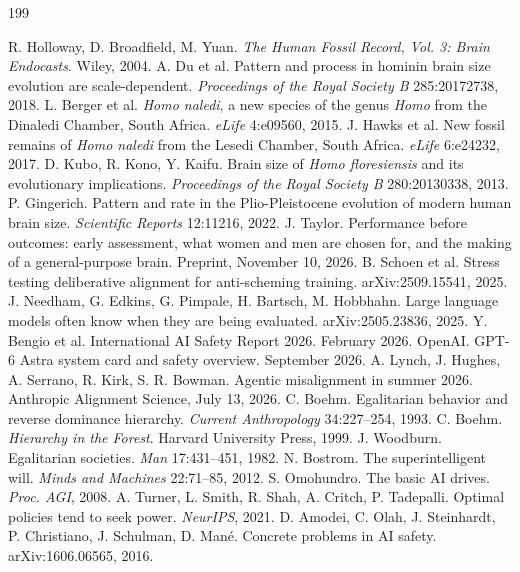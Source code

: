 \documentclass[10pt,twocolumn]{article}
\theoremstyle{plain}
\theoremstyle{definition}
\begin{document}
\normalsize
\begin{thebibliography}{199}

 R. Holloway, D. Broadfield, M. Yuan. \emph{The Human Fossil Record, Vol. 3: Brain Endocasts}. Wiley, 2004.
 A. Du et al. Pattern and process in hominin brain size evolution are scale-dependent. \emph{Proceedings of the Royal Society B} 285:20172738, 2018.
 L. Berger et al. \emph{Homo naledi}, a new species of the genus \emph{Homo} from the Dinaledi Chamber, South Africa. \emph{eLife} 4:e09560, 2015.
 J. Hawks et al. New fossil remains of \emph{Homo naledi} from the Lesedi Chamber, South Africa. \emph{eLife} 6:e24232, 2017.
 D. Kubo, R. Kono, Y. Kaifu. Brain size of \emph{Homo floresiensis} and its evolutionary implications. \emph{Proceedings of the Royal Society B} 280:20130338, 2013.
 P. Gingerich. Pattern and rate in the Plio-Pleistocene evolution of modern human brain size. \emph{Scientific Reports} 12:11216, 2022.
 J. Taylor. Performance before outcomes: early assessment, what women and men are chosen for, and the making of a general-purpose brain. Preprint, November 10, 2026.
 B. Schoen et al. Stress testing deliberative alignment for anti-scheming training. arXiv:2509.15541, 2025.
 J. Needham, G. Edkins, G. Pimpale, H. Bartsch, M. Hobbhahn. Large language models often know when they are being evaluated. arXiv:2505.23836, 2025.
 Y. Bengio et al. International AI Safety Report 2026. February 2026.
 OpenAI. GPT-6 Astra system card and safety overview. September 2026.
 A. Lynch, J. Hughes, A. Serrano, R. Kirk, S. R. Bowman. Agentic misalignment in summer 2026. Anthropic Alignment Science, July 13, 2026.
 C. Boehm. Egalitarian behavior and reverse dominance hierarchy. \emph{Current Anthropology} 34:227--254, 1993.
 C. Boehm. \emph{Hierarchy in the Forest}. Harvard University Press, 1999.
 J. Woodburn. Egalitarian societies. \emph{Man} 17:431--451, 1982.
 N. Bostrom. The superintelligent will. \emph{Minds and Machines} 22:71--85, 2012.
 S. Omohundro. The basic AI drives. \emph{Proc. AGI}, 2008.
 A. Turner, L. Smith, R. Shah, A. Critch, P. Tadepalli. Optimal policies tend to seek power. \emph{NeurIPS}, 2021.
 D. Amodei, C. Olah, J. Steinhardt, P. Christiano, J. Schulman, D. Man\'e. Concrete problems in AI safety. arXiv:1606.06565, 2016.

\end{thebibliography}
\end{document}
